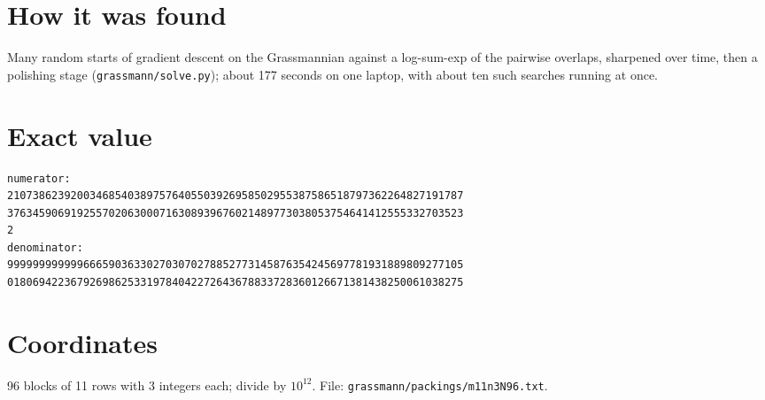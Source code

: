 \documentclass[11pt,a4paper]{article}
\begin{document}
\section{How it was found}
Many random starts of gradient descent on the Grassmannian against a log-sum-exp of the pairwise overlaps, sharpened over time, then a polishing stage (\texttt{grassmann/solve.py}); about 177 seconds on one laptop, with about ten such searches running at once.


\appendix
\section{Exact value}
{\small
\begin{verbatim}
numerator:
210738623920034685403897576405503926958502955387586518797362264827191787
376345906919255702063000716308939676021489773038053754641412555332703523
2
denominator:
999999999999666590363302703070278852773145876354245697781931889809277105
018069422367926986253319784042272643678833728360126671381438250061038275
\end{verbatim}}

\section{Coordinates}
96 blocks of 11 rows with 3 integers each; divide by $10^{12}$. File: \texttt{grassmann/packings/m11n3N96.txt}.
{\tiny
\begin{multicols}{3}
\end{multicols}}
\end{document}
